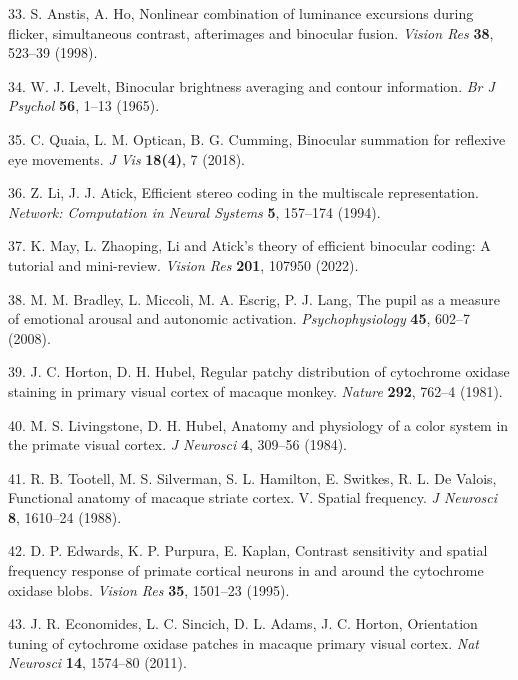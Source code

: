 \documentclass[
]{article}
\begin{document}
\leavevmode\hypertarget{ref-Anstis1998}{}%
33. S. Anstis, A. Ho, Nonlinear combination of luminance excursions during flicker, simultaneous contrast, afterimages and binocular fusion. \emph{Vision Res} \textbf{38}, 523--39 (1998).

\leavevmode\hypertarget{ref-Levelt1965}{}%
34. W. J. Levelt, Binocular brightness averaging and contour information. \emph{Br J Psychol} \textbf{56}, 1--13 (1965).

\leavevmode\hypertarget{ref-Quaia2018}{}%
35. C. Quaia, L. M. Optican, B. G. Cumming, Binocular summation for reflexive eye movements. \emph{J Vis} \textbf{18(4)}, 7 (2018).

\leavevmode\hypertarget{ref-Li1994}{}%
36. Z. Li, J. J. Atick, Efficient stereo coding in the multiscale representation. \emph{Network: Computation in Neural Systems} \textbf{5}, 157--174 (1994).

\leavevmode\hypertarget{ref-May2022}{}%
37. K. May, L. Zhaoping, Li and Atick's theory of efficient binocular coding: A tutorial and mini-review. \emph{Vision Res} \textbf{201}, 107950 (2022).

\leavevmode\hypertarget{ref-Bradley2008}{}%
38. M. M. Bradley, L. Miccoli, M. A. Escrig, P. J. Lang, The pupil as a measure of emotional arousal and autonomic activation. \emph{Psychophysiology} \textbf{45}, 602--7 (2008).

\leavevmode\hypertarget{ref-Horton1981}{}%
39. J. C. Horton, D. H. Hubel, Regular patchy distribution of cytochrome oxidase staining in primary visual cortex of macaque monkey. \emph{Nature} \textbf{292}, 762--4 (1981).

\leavevmode\hypertarget{ref-Livingstone1984}{}%
40. M. S. Livingstone, D. H. Hubel, Anatomy and physiology of a color system in the primate visual cortex. \emph{J Neurosci} \textbf{4}, 309--56 (1984).

\leavevmode\hypertarget{ref-Tootell1988}{}%
41. R. B. Tootell, M. S. Silverman, S. L. Hamilton, E. Switkes, R. L. De Valois, Functional anatomy of macaque striate cortex. V. Spatial frequency. \emph{J Neurosci} \textbf{8}, 1610--24 (1988).

\leavevmode\hypertarget{ref-Edwards1995}{}%
42. D. P. Edwards, K. P. Purpura, E. Kaplan, Contrast sensitivity and spatial frequency response of primate cortical neurons in and around the cytochrome oxidase blobs. \emph{Vision Res} \textbf{35}, 1501--23 (1995).

\leavevmode\hypertarget{ref-Economides2011}{}%
43. J. R. Economides, L. C. Sincich, D. L. Adams, J. C. Horton, Orientation tuning of cytochrome oxidase patches in macaque primary visual cortex. \emph{Nat Neurosci} \textbf{14}, 1574--80 (2011).
\end{document}

